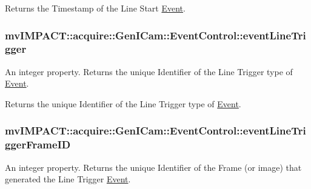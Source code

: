 Returns the Timestamp of the Line Start \hyperlink{classmv_i_m_p_a_c_t_1_1acquire_1_1_event}{Event}. \hypertarget{classmv_i_m_p_a_c_t_1_1acquire_1_1_gen_i_cam_1_1_event_control_a2756bf3c6e8999af797a204bf5f1603a}{
\subsubsection[{event\+Line\+Trigger}]{ mv\+I\+M\+P\+A\+C\+T\+::acquire\+::\+Gen\+I\+Cam\+::\+Event\+Control\+::event\+Line\+Trigger}}\label{classmv_i_m_p_a_c_t_1_1acquire_1_1_gen_i_cam_1_1_event_control_a2756bf3c6e8999af797a204bf5f1603a}


An integer property. Returns the unique Identifier of the Line Trigger type of \hyperlink{classmv_i_m_p_a_c_t_1_1acquire_1_1_event}{Event}. 

Returns the unique Identifier of the Line Trigger type of \hyperlink{classmv_i_m_p_a_c_t_1_1acquire_1_1_event}{Event}. \hypertarget{classmv_i_m_p_a_c_t_1_1acquire_1_1_gen_i_cam_1_1_event_control_a61cdd8eb786178bcadfaf2576d608541}{
\subsubsection[{event\+Line\+Trigger\+Frame\+I\+D}]{ mv\+I\+M\+P\+A\+C\+T\+::acquire\+::\+Gen\+I\+Cam\+::\+Event\+Control\+::event\+Line\+Trigger\+Frame\+I\+D}}\label{classmv_i_m_p_a_c_t_1_1acquire_1_1_gen_i_cam_1_1_event_control_a61cdd8eb786178bcadfaf2576d608541}


An integer property. Returns the unique Identifier of the Frame (or image) that generated the Line Trigger \hyperlink{classmv_i_m_p_a_c_t_1_1acquire_1_1_event}{Event}. 

